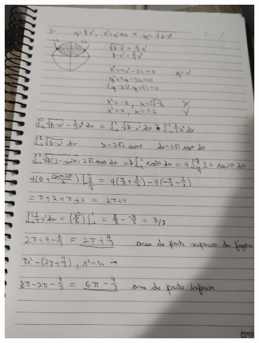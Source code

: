 \documentclass[12pt]{article}
\begin{document}
\begin{figure}[h!]
	\includegraphics[scale=0.14]{q3}
\end{figure}
\end{document}
